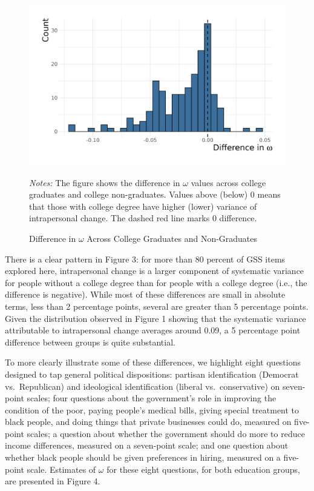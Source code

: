 \documentclass[
  12pt,
]{article}
\begin{document}
\begin{figure}[hbt]
\begin{center}
\caption{Difference in $\omega$ Across College Graduates and Non-Graduates}

\includegraphics[width=450px]{../figures/figure_3}

\end{center}
\footnotesize{\textit{Notes:} The figure shows the difference in $\omega$ values across college graduates and college non-graduates. Values above (below) 0 means that those with college degree have higher (lower) variance of intrapersonal change. The dashed red line marks 0 difference.}
\end{figure}

There is a clear pattern in Figure 3: for more than 80 percent of GSS
items explored here, intrapersonal change is a larger component of
systematic variance for people without a college degree than for people
with a college degree (i.e., the difference is negative). While most of
these differences are small in absolute terms, less than 2 percentage
points, several are greater than 5 percentage points. Given the
distribution observed in Figure 1 showing that the systematic variance
attributable to intrapersonal change averages around 0.09, a 5
percentage point difference between groups is quite substantial.

To more clearly illustrate some of these differences, we highlight eight
questions designed to tap general political dispositions: partisan
identification (Democrat vs.~Republican) and ideological identification
(liberal vs.~conservative) on seven-point scales; four questions about
the government's role in improving the condition of the poor, paying
people's medical bills, giving special treatment to black people, and
doing things that private businesses could do, measured on five-point
scales; a question about whether the government should do more to reduce
income differences, measured on a seven-point scale; and one question
about whether black people should be given preferences in hiring,
measured on a five-point scale. Estimates of \(\omega\) for these eight
questions, for both education groups, are presented in Figure 4.
\end{document}
